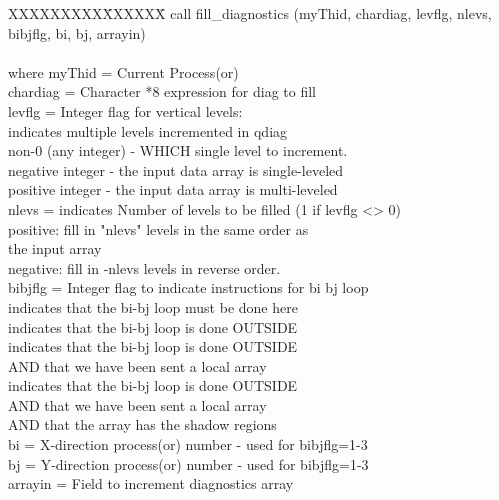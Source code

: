 \noindent
\begin{tabbing}
XXXXXXXXX\=XXXXXX\= \kill
\>        call fill\_diagnostics (myThid, chardiag, levflg, nlevs, \\
                bibjflg, bi, bj, arrayin) \\
\\
where \>  myThid   \>= Current Process(or) \\
      \>  chardiag \>= Character *8 expression for diag to fill \\
      \>  levflg   \>= Integer flag for vertical levels: \\
      \>            indicates multiple levels incremented in qdiag \\
      \>           \> non-0 (any integer) - WHICH single level to increment. \\
      \>           \> negative integer - the input data array is single-leveled \\
      \>           \> positive integer - the input data array is multi-leveled \\
      \>  nlevs    \>= indicates Number of levels to be filled (1 if levflg <> 0) \\
      \>           \> positive: fill in "nlevs" levels in the same order as \\
      \>           \> the input array \\
      \>           \> negative: fill in -nlevs levels in reverse order. \\
      \>  bibjflg  \>= Integer flag to indicate instructions for bi bj loop \\
      \>            indicates that the bi-bj loop must be done here \\
      \>            indicates that the bi-bj loop is done OUTSIDE \\
      \>            indicates that the bi-bj loop is done OUTSIDE \\
      \>           \>    AND that we have been sent a local array \\
      \>            indicates that the bi-bj loop is done OUTSIDE \\
      \>           \>    AND that we have been sent a local array \\
      \>           \>    AND that the array has the shadow regions \\
      \>  bi       \>= X-direction process(or) number - used for bibjflg=1-3 \\
      \>  bj       \>= Y-direction process(or) number - used for bibjflg=1-3 \\
      \>  arrayin  \>= Field to increment diagnostics array \\
\end{tabbing}


